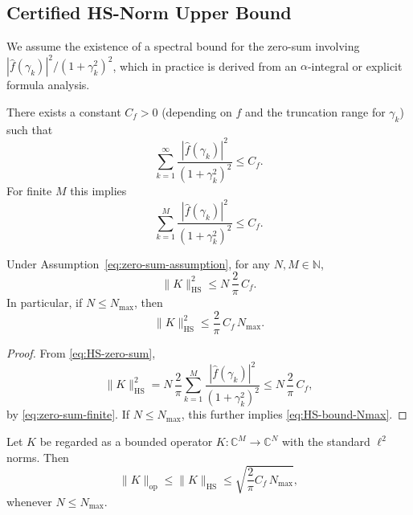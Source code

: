 \documentclass[11pt]{article}
\begin{document}
\subsection{Certified HS-Norm Upper Bound}

We assume the existence of a spectral bound for the zero-sum involving $|\widehat{f}(\gamma_k)|^2/(1+\gamma_k^2)^2$, which in practice is derived from an $\alpha$-integral or explicit formula analysis.

\begin{assumption}
There exists a constant $C_f>0$ (depending on $f$ and the truncation range for $\gamma_k$) such that
\begin{equation}
  \sum_{k=1}^\infty
    \frac{|\widehat{f}(\gamma_k)|^2}{(1+\gamma_k^2)^2}
  \le C_f.
  \label{eq:zero-sum-assumption}
\end{equation}
For finite $M$ this implies
\begin{equation}
  \sum_{k=1}^M
    \frac{|\widehat{f}(\gamma_k)|^2}{(1+\gamma_k^2)^2}
  \le C_f.
  \label{eq:zero-sum-finite}
\end{equation}
\end{assumption}

\begin{theorem}
Under Assumption~\ref{eq:zero-sum-assumption}, for any $N,M\in\mathbb{N}$,
\begin{equation}
  \|K\|_{\mathrm{HS}}^2
    \le N\,\frac{2}{\pi}\,C_f.
  \label{eq:HS-bound}
\end{equation}
In particular, if $N\le N_{\max}$, then
\begin{equation}
  \|K\|_{\mathrm{HS}}^2
    \le \frac{2}{\pi}\,C_f\,N_{\max}.
  \label{eq:HS-bound-Nmax}
\end{equation}
\end{theorem}

\begin{proof}
From \eqref{eq:HS-zero-sum},
\[
\|K\|_{\mathrm{HS}}^2
  = N\,\frac{2}{\pi}
      \sum_{k=1}^M
        \frac{|\widehat{f}(\gamma_k)|^2}{(1+\gamma_k^2)^2}
  \le N\,\frac{2}{\pi}\,C_f,
\]
by \eqref{eq:zero-sum-finite}. If $N\le N_{\max}$, this further implies \eqref{eq:HS-bound-Nmax}.
\end{proof}

\begin{corollary}
Let $K$ be regarded as a bounded operator $K:\mathbb{C}^M\to \mathbb{C}^N$ with the standard $\ell^2$ norms. Then
\begin{equation}
  \|K\|_{\mathrm{op}}
    \le \|K\|_{\mathrm{HS}}
    \le \sqrt{\frac{2}{\pi}C_f\,N_{\max}},
\end{equation}
whenever $N\le N_{\max}$.
\end{corollary}
\end{document}
